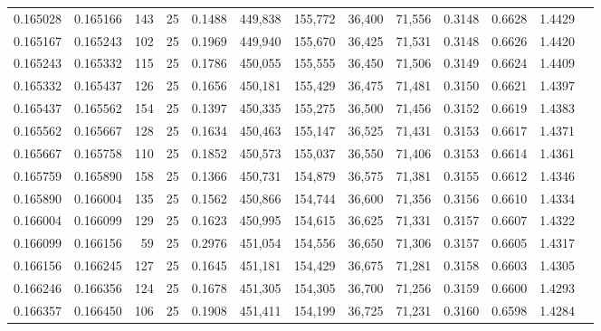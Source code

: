 \begin{tabular}{rrrrrrrrrrrrr}
0.165028 & 0.165166 &   143 &  25 &                                     0.1488 & 449,838 & 155,772 &  36,400 &  71,556 & 0.3148 & 0.6628 & 1.4429 \\
0.165167 & 0.165243 &   102 &  25 &                                     0.1969 & 449,940 & 155,670 &  36,425 &  71,531 & 0.3148 & 0.6626 & 1.4420 \\
0.165243 & 0.165332 &   115 &  25 &                                     0.1786 & 450,055 & 155,555 &  36,450 &  71,506 & 0.3149 & 0.6624 & 1.4409 \\
0.165332 & 0.165437 &   126 &  25 &                                     0.1656 & 450,181 & 155,429 &  36,475 &  71,481 & 0.3150 & 0.6621 & 1.4397 \\
0.165437 & 0.165562 &   154 &  25 &                                     0.1397 & 450,335 & 155,275 &  36,500 &  71,456 & 0.3152 & 0.6619 & 1.4383 \\
0.165562 & 0.165667 &   128 &  25 &                                     0.1634 & 450,463 & 155,147 &  36,525 &  71,431 & 0.3153 & 0.6617 & 1.4371 \\
0.165667 & 0.165758 &   110 &  25 &                                     0.1852 & 450,573 & 155,037 &  36,550 &  71,406 & 0.3153 & 0.6614 & 1.4361 \\
0.165759 & 0.165890 &   158 &  25 &                                     0.1366 & 450,731 & 154,879 &  36,575 &  71,381 & 0.3155 & 0.6612 & 1.4346 \\
0.165890 & 0.166004 &   135 &  25 &                                     0.1562 & 450,866 & 154,744 &  36,600 &  71,356 & 0.3156 & 0.6610 & 1.4334 \\
0.166004 & 0.166099 &   129 &  25 &                                     0.1623 & 450,995 & 154,615 &  36,625 &  71,331 & 0.3157 & 0.6607 & 1.4322 \\
0.166099 & 0.166156 &    59 &  25 &                                     0.2976 & 451,054 & 154,556 &  36,650 &  71,306 & 0.3157 & 0.6605 & 1.4317 \\
0.166156 & 0.166245 &   127 &  25 &                                     0.1645 & 451,181 & 154,429 &  36,675 &  71,281 & 0.3158 & 0.6603 & 1.4305 \\
0.166246 & 0.166356 &   124 &  25 &                                     0.1678 & 451,305 & 154,305 &  36,700 &  71,256 & 0.3159 & 0.6600 & 1.4293 \\
0.166357 & 0.166450 &   106 &  25 &                                     0.1908 & 451,411 & 154,199 &  36,725 &  71,231 & 0.3160 & 0.6598 & 1.4284 \\

\end{tabular}
